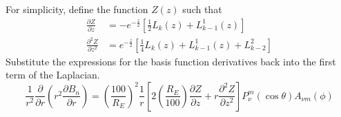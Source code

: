 \documentclass[12pt,letterpaper]{article}
\begin{document}
  For simplicity, define the function \(Z(z)\) such that
  \begin{align}
    \frac{\partial Z}{\partial z} &= -e^{-\frac{z}{2}}\left[\frac{1}{2}L_k(z)+L_{k-1}^1(z)\right] \\
    \frac{\partial^2 Z}{\partial z^2} &= e^{-\frac{z}{2}}\left[\frac{1}{4}L_k(z)+L_{k-1}^1(z)+L_{k-2}^2\right]
  \end{align}
  Substitute the expressions for the basis function derivatives back into the first term of the Laplacian.
  \begin{equation}
    \frac{1}{r^2}\frac{\partial}{\partial r}\left(r^2\frac{\partial B_n}{\partial r}\right) = \left(\frac{100}{R_E}\right)^2\frac{1}{r}\left[2\left(\frac{R_E}{100}\right)\frac{\partial Z}{\partial z} + r\frac{\partial^2 Z}{\partial z^2}\right]P_\nu^m(\cos\theta) A_{\nu m}(\phi)
  \end{equation}
\end{document}
